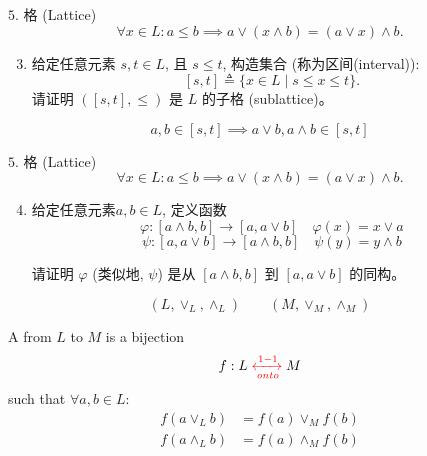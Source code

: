 \begin{frame}{}
  \begin{exampleblock}{$5.$ 格 (Lattice)}
    \[
      \forall x \in L: a \le b \implies a \lor (x \land b) = (a \lor x) \land b.
    \]

    \begin{enumerate}[(1)]
      \setcounter{enumi}{2}
      \item 给定任意元素 $s, t \in L$, 且 $s \le t$, 构造集合 (称为区间(interval)):
	\[
	  [s, t] \triangleq \{x \in L \mid s \le x \le t\}.
	\]
	请证明 $([s,t], \le)$ 是 $L$ 的子格 (sublattice)。
    \end{enumerate}
  \end{exampleblock}

  \pause

  \pause
  \vspace{-0.50cm}
  \[
    a,b \in [s,t] \implies a \lor b, a \land b \in [s,t]
  \]
\end{frame}

\begin{frame}{}
  \begin{exampleblock}{$5.$ 格 (Lattice)}
    \[
      \forall x \in L: a \le b \implies a \lor (x \land b) = (a \lor x) \land b.
    \]

    \begin{enumerate}[(1)]
      \setcounter{enumi}{3}
      \item 给定任意元素$a, b \in L$, 定义函数
	\[
	  \varphi: [a \land b, b] \to [a, a \lor b]  \quad \varphi(x) = x \lor a
	\]
	\[
	  \psi: [a, a \lor b] \to [a \land b, b] \quad \psi(y) = y \land b
	\]

	请证明 $\varphi$ (类似地, $\psi$) 是从 $[a \land b, b]$ 到 $[a, a \lor b]$ 的同构。
	
    \end{enumerate}
  \end{exampleblock}
\end{frame}

\begin{frame}{}
  \begin{definition}
    \[
      (L, \lor_{L}, \land_{L})  \qquad (M, \lor_{M}, \land_{M})
    \]

    A  from $L$ to $M$ is a bijection
    \[
      f: L \textcolor{red}{\;\xleftrightarrow[onto]{1-1}\;} M
    \]
    such that $\forall a, b \in L$:
    \vspace{-0.30cm}
    \begin{align*}
      f(a \lor_{L} b) &= f(a) \lor_{M} f(b) \\
      f(a \land_{L} b) &= f(a) \land_{M} f(b)
    \end{align*}
  \end{definition}

  \pause
  \vspace{0.60cm}
  \centerline{}
\end{frame}

